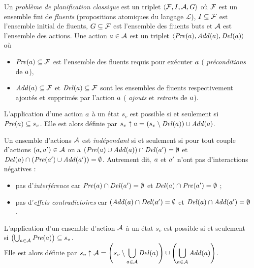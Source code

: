 \begin{definition}
Un \emph{problème de planification classique} %
est un triplet $\langle \mathcal{F}, I, \mathcal{A} , G \rangle$ où $\mathcal{F}$ est un ensemble fini de \emph{fluents} (propositions atomiques du langage $\mathcal{L}$), $I \subseteq \mathcal{F}$ est l'ensemble initial de fluents, $G \subseteq \mathcal{F}$ est l'ensemble des fluents buts et $\mathcal{A}$ est l'ensemble des actions.
Une action $a \in \mathcal{A}$ est un triplet $\langle \mathit{Pre}(a), \mathit{Add}(a), \mathit{Del}(a) \rangle$ où

\begin{itemize}
\item $\mathit{Pre}(a) \subseteq \mathcal{F}$ est l'ensemble des fluents requis pour exécuter $a$ (%
\emph{préconditions} de $a$),
\item $\mathit{Add}(a) \subseteq \mathcal{F}$ et $\mathit{Del}(a) \subseteq \mathcal{F}$ sont les ensembles de fluents respectivement ajoutés et supprimés par l'action $a$ (%
\emph{ajouts} et %
\emph{retraits} de $a$).
\end{itemize}
\end{definition}

\begin{definition}
L'application d'une action $a$ à un état $s_{v}$ est possible si et seulement si $\mathit{Pre}(a)\subseteq s_{v}$. Elle est alors définie par $s_{v}\uparrow a=(s_{v} \setminus \mathit{Del}(a)) \cup \mathit{Add}(a)$.
\end{definition}

\begin{definition}
Un ensemble d'actions $\mathcal{A}$ est \emph{indépendant} si et seulement si pour tout couple d'actions $(a,a')\in\mathcal{A}$ on a $(\mathit{Pre}(a)\cup\mathit{Add}(a))\cap\mathit{Del}(a')=\emptyset$ et $\mathit{Del}(a)\cap(\mathit{Pre}(a')\cup\mathit{Add}(a'))=\emptyset$.
Autrement dit, $a$ et $a'$ n'ont pas d'interactions négatives :
\begin{itemize}
    \item pas d'\emph{interférence} car $\mathit{Pre}(a)\cap\mathit{Del}(a')=\emptyset$ et $\mathit{Del}(a)\cap\mathit{Pre}(a')=\emptyset$ ; 
    \item pas d'\emph{effets contradictoires} car $(\mathit{Add}(a)\cap\mathit{Del}(a')=\emptyset$ et $\mathit{Del}(a)\cap\mathit{Add}(a')=\emptyset$.
\end{itemize}
\end{definition}

\begin{definition}
L'application d'un ensemble d'action $\mathcal{A}$ à un état $s_{v}$ est possible si et seulement si $\left(\bigcup_{a\in\mathcal{A}}\mathit{Pre}(a)\right)\subseteq s_{v}$.\\ Elle est alors définie par $\displaystyle s_{v}\uparrow \mathcal{A}=\left(s_{v} \setminus \bigcup_{a\in\mathcal{A}}\mathit{Del}(a)\right) \cup \left(\bigcup_{a\in\mathcal{A}}\mathit{Add}(a)\right)$.
\end{definition}

